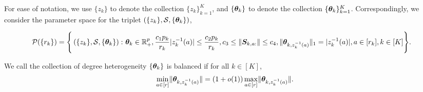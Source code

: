\documentclass[lettersize,onecolumn,journal]{IEEEtran}
\theoremstyle{definition}
\theoremstyle{definition}
\newcommand{\of}[1]{\left(#1\right)}
\newcommand{\offf}[1]{\left\{#1\right\}}
\begin{document}
For ease of notation, we use $\{z_k\}$ to denote the collection $\{z_k\}_{k=1}^K$, and $\{\boldsymbol{\theta}_k\}$ to denote the collection $\{\boldsymbol{\theta}_k\}_{k=1}^K$. Correspondingly, we consider the parameter space for the triplet $\of{\{z_k\}, \tS, \{\mtheta_k\}}$,

\footnotesize
\begin{align}
    \tP(\{r_k\}) = \Bigg\{ \of{\{z_k\}, \tS, \{\mtheta_k\}}:\  &\mtheta_k \in\mathbb{R}^p_{+}, {c_1 p_k\over r_k} |z_k^{-1}(a)| \leq {c_2 p_k\over r_k}, c_3 \leq  \onorm{\mS_{k,a:}} \leq c_4 ,\onormSize{}{\mtheta_{k,z_k^{-1}(a)}}_1=|z_k^{-1}(a)|, a \in [r_k], k\in[K]\Bigg\}. \label{eq:general_family}
\end{align}
\normalsize

We call the collection of degree heterogeneity $\{\boldsymbol{\theta}_k\}$ is balanced if for all $k \in [K]$,
\begin{equation}\label{eq:general_balanced}
    {\min_{a\in[r]} \onormSize{}{\mtheta_{k, z_k^{-1}(a)}}=\left(1+o(1)\right)\max_{a\in[r]}\onormSize{}{\mtheta_{k,z_k^{-1}(a)}}}.
\end{equation}
\end{document}
